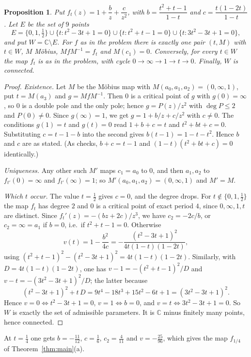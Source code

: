 \documentclass[11pt]{article}
\newtheorem{proposition}{Proposition}[section]
\theoremstyle{definition}
\begin{document}
\begin{proposition}\label{prop:normal}
Put $f_t(z)=1+\dfrac bz+\dfrac c{z^2}$, with $b=\dfrac{t^2+t-1}{1-t}$ and $c=\dfrac{t(1-2t)}{1-t}$. Let $E$ be the set of $9$ points
\[E=\{0,1,\tfrac12\}\cup\{t:t^2-3t+1=0\}\cup\{t:t^2+t-1=0\}\cup\{t:3t^2-3t+1=0\},\]
and put $W=\mathbb C\setminus E$. For $f$ as in the problem there is exactly one pair $(t,M)$ with $t\in W$, $M$ M\"obius, $MfM^{-1}=f_t$ and $M(c_1)=0$. Conversely, for every $t\in W$ the map $f_t$ is as in the problem, with cycle $0\to\infty\to1\to t\to0$. Finally, $W$ is connected.
\end{proposition}

\begin{proof}
\emph{Existence.} Let $M$ be the M\"obius map with $M(a_0,a_1,a_2)=(0,\infty,1)$, put $t=M(a_3)$ and $g=MfM^{-1}$. Then $0$ is a critical point of $g$ with $g(0)=\infty$, so $0$ is a double pole and the only pole; hence $g=P(z)/z^2$ with $\deg P\le2$ and $P(0)\ne0$. Since $g(\infty)=1$, we get $g=1+b/z+c/z^2$ with $c\ne0$. The conditions $g(1)=t$ and $g(t)=0$ read $1+b+c=t$ and $t^2+bt+c=0$. Substituting $c=t-1-b$ into the second gives $b(t-1)=1-t-t^2$. Hence $b$ and $c$ are as stated. (As checks, $b+c=t-1$ and $(1-t)(t^2+bt+c)=0$ identically.)

\emph{Uniqueness.} Any other such $M'$ maps $c_1=a_0$ to $0$, and then $a_1,a_2$ to $f_{t'}(0)=\infty$ and $f_{t'}(\infty)=1$; so $M'(a_0,a_1,a_2)=(0,\infty,1)$ and $M'=M$.

\emph{Which $t$ occur.} The value $t=\tfrac12$ gives $c=0$, and the degree drops. For $t\notin\{0,1,\tfrac12\}$ the map $f_t$ has degree $2$ and $0$ is a critical point of exact period $4$, since $0,\infty,1,t$ are distinct. Since $f_t'(z)=-(bz+2c)/z^3$, we have $c_2=-2c/b$, or $c_2=\infty=a_1$ if $b=0$, i.e.\ if $t^2+t-1=0$. Otherwise
\[v(t)=1-\frac{b^2}{4c}=-\frac{(t^2-3t+1)^2}{4t(1-t)(1-2t)},\]
using $(t^2+t-1)^2-(t^2-3t+1)^2=4t(1-t)(1-2t)$. Similarly, with $D=4t(1-t)(1-2t)$, one has $v-1=-(t^2+t-1)^2/D$ and $v-t=-(3t^2-3t+1)^2/D$; the latter because
\[(t^2-3t+1)^2+t\,D=9t^4-18t^3+15t^2-6t+1=(3t^2-3t+1)^2.\]
Hence $v=0\iff t^2-3t+1=0$, $v=1\iff b=0$, and $v=t\iff 3t^2-3t+1=0$. So $W$ is exactly the set of admissible parameters. It is $\mathbb C$ minus finitely many points, hence connected.
\end{proof}

At $t=\tfrac14$ one gets $b=-\tfrac{11}{12}$, $c=\tfrac16$, $c_2=\tfrac4{11}$ and $v=-\tfrac{25}{96}$, which gives the map $f_{1/4}$ of Theorem~\ref{thm:main}(a).
\end{document}
